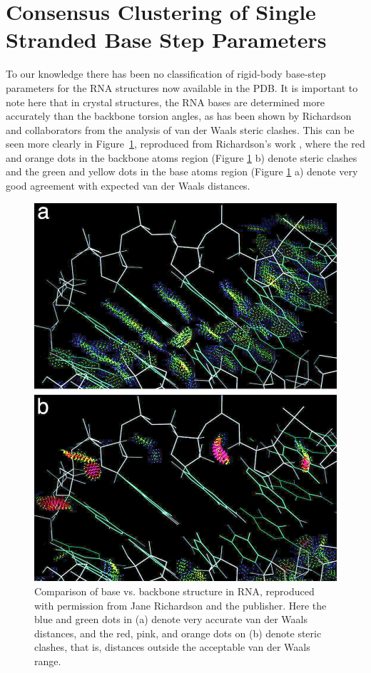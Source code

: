 \section{Consensus Clustering of Single Stranded Base Step Parameters}
To  our  knowledge there  has  been  no  classification of  rigid-body
base-step parameters for the RNA  structures now available in the PDB.
It is important to note here that in crystal structures, the RNA bases
are determined  more accurately than  the backbone torsion  angles, as
has been  shown by Richardson  and collaborators from the  analysis of
van  der Waals  steric  clashes.  This  can  be seen  more clearly  in
Figure~\ref{fig:murray},    reproduced    from    Richardson's    work
\cite{murray2003}, where the red and orange dots in the backbone atoms
region (Figure \ref{fig:murray} b) denote steric clashes and the green
and yellow dots in the base atoms region (Figure \ref{fig:murray} a)
denote very good agreement with expected van der Waals distances.
\begin{figure}[htbp]
 \centering
 \includegraphics[scale=0.4]{Chapter2/murray2003.png}
 \caption{Comparison   of  base  vs.    backbone  structure   in  RNA,
   reproduced with  permission from Jane  Richardson \cite{murray2003}
   and the publisher. Here the blue  and green dots in (a) denote very
   accurate van  der Waals  distances, and the  red, pink,  and orange
   dots on (b)  denote steric clashes, that is,  distances outside the
   acceptable van der Waals range.}
 \label{fig:murray}
\end{figure}

